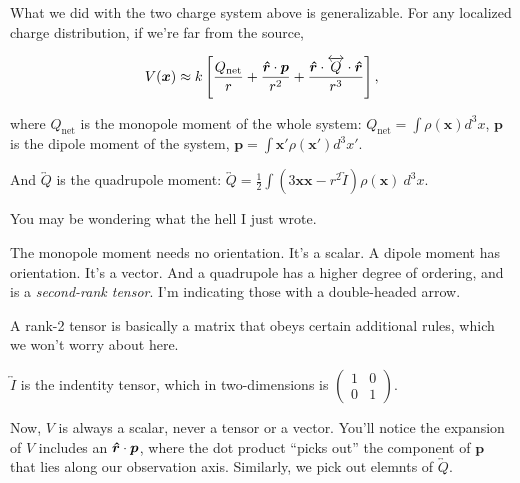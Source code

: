 \documentclass{article}
\begin{document}
\vspace{1em}

What we did with the two charge system above is generalizable. For any localized charge distribution, if we're far from the source,

\begin{equation*}
    V(\bm{x}) \approx k \left[ \frac{Q_{\text{net}}}{r} + \frac{\bm{\hat{r}} \cdot \bm{p}}{r^2} + \frac{\bm{\hat{r}} \cdot \overleftrightarrow{Q} \cdot \bm{\hat{r}}}{r^3} \right],
\end{equation*}

where $Q_{\text{net}}$ is the monopole moment of the whole system: $\displaystyle Q_{\text{net}} = \int \rho(\bm{x}) d^3x$, $\bm{p}$ is the dipole moment of the system, $\displaystyle \bm{p} = \int \bm{x'} \rho(\bm{x'}) d^3x'$.

And $\overleftrightarrow{Q}$ is the quadrupole moment: $\displaystyle \overleftrightarrow{Q} = \frac{1}{2} \int \left( 3 \bm{x}\bm{x} - r^2 \overleftrightarrow{I} \right) \rho(\bm{x})\ d^3x$.

\vspace{1em}

You may be wondering what the hell I just wrote.

The monopole moment needs no orientation. It's a scalar. A dipole moment has orientation. It's a vector. And a quadrupole has a higher degree of ordering, and is a \emph{second-rank tensor}. I'm indicating those with a double-headed arrow.

A rank-2 tensor is basically a matrix that obeys certain additional rules, which we won't worry about here.

\vspace{1em}

$\displaystyle \overleftrightarrow{I}$ is the indentity tensor, which in two-dimensions is $\displaystyle \begin{pmatrix} 1 & 0 \\ 0 & 1 \end{pmatrix}$.

\vspace{1em}

Now, $V$ is always a scalar, never a tensor or a vector. You'll notice the expansion of $V$ includes an $\bm{\hat{r}} \cdot \bm{p}$, where the dot product ``picks out'' the component of $\bm{p}$ that lies along our observation axis. Similarly, we pick out elemnts of $\overleftrightarrow{Q}$.

\vspace{1em}
\end{document}
